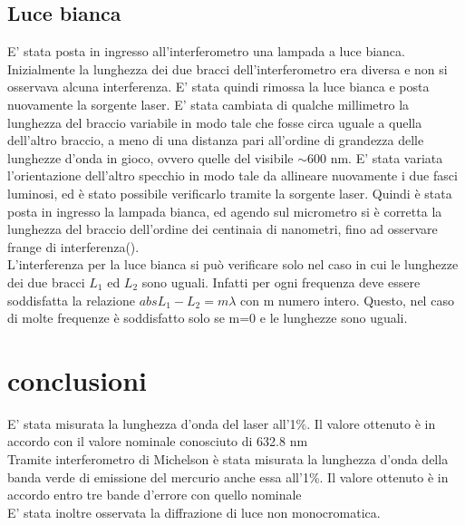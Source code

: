 \subsection{Luce bianca}
E' stata posta in ingresso all'interferometro una lampada a luce bianca.\\
Inizialmente la lunghezza dei due bracci dell'interferometro era diversa e non si osservava alcuna interferenza. E' stata quindi rimossa la luce bianca e posta nuovamente la sorgente laser. E' stata cambiata di qualche millimetro la lunghezza del braccio variabile in modo tale che fosse circa uguale a quella dell'altro braccio, a meno di una distanza pari all'ordine di grandezza delle lunghezze d'onda in gioco, ovvero quelle del visibile $\sim$600 nm. E' stata variata l'orientazione dell'altro specchio in modo tale da allineare nuovamente i due fasci luminosi, ed è stato possibile verificarlo tramite la sorgente laser. Quindi è stata posta in ingresso la lampada bianca, ed agendo sul micrometro si è corretta la lunghezza del braccio dell'ordine dei centinaia di nanometri, fino ad osservare frange di interferenza().\\
L'interferenza per la luce bianca si può verificare solo nel caso in cui le lunghezze dei due bracci $L_1$ ed $L_2$ sono uguali. Infatti per ogni frequenza deve essere soddisfatta la relazione $abs{L_1-L_2}=m\lambda$ con m numero intero. Questo, nel caso di molte frequenze è soddisfatto solo se m=0 e le lunghezze sono uguali.\\
\section{conclusioni}
E' stata misurata la lunghezza d'onda del laser all'1\%. Il valore ottenuto è in accordo con il valore nominale conosciuto di 632.8 nm\\
Tramite interferometro di Michelson è stata misurata la lunghezza d'onda della banda verde di emissione del mercurio anche essa all'1\%. Il valore ottenuto è in accordo entro tre bande d'errore  con quello nominale\\ E' stata inoltre osservata la diffrazione di luce non monocromatica.
